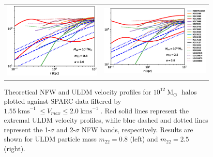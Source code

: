 \documentclass[a4paper,11pt]{article}
\begin{document}
\begin{figure}
\begin{tabular}{cc}
{\includegraphics[scale = 0.65, trim={2.5cm 2.5cm 2.6cm 0.5cm}]{pics/v_12_8_3_paper.eps}} &
{\includegraphics[scale = 0.65, trim={2.5cm 2.5cm 0cm 0.5cm}]{pics/v_12_25_3_paper.eps}}
\end{tabular}
\caption{Theoretical NFW and ULDM velocity profiles for $10^{12}\operatorname{M}_{\odot}$ halos plotted against SPARC data filtered by $1.55 \operatorname{kms}^{-1}\leq V_{max}\leq 2.0 \operatorname{kms}^{-1}$. Red solid lines represent the extremal ULDM velocity profiles, while  blue dashed and dotted lines represent the 1-$\sigma$ and 2-$\sigma$ NFW bands, respectively. Results are shown for ULDM particle mass $m_{22} = 0.8$ (left) and $m_{22} = 2.5 $ (right).}\label{fig:velocity_12}
\end{figure}
\end{document}

